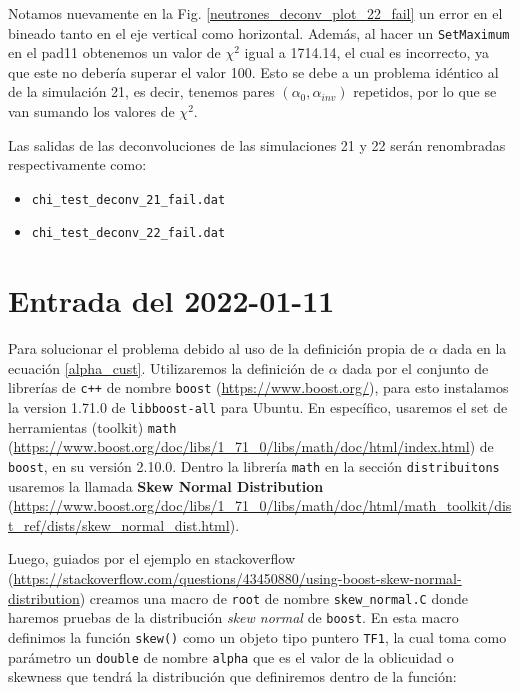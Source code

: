 \documentclass[11pt,letterpaper]{article}
\begin{document}
Notamos nuevamente en la  Fig. \ref{neutrones_deconv_plot_22_fail} un error en el bineado tanto en el eje vertical como horizontal. Además, al hacer un \verb|SetMaximum| en el pad11 obtenemos un valor de $\chi^2$ igual a 1714.14, el cual es incorrecto, ya que este no debería superar el valor 100. Esto se debe a un problema idéntico al de la simulación 21, es decir, tenemos pares $(\alpha_{0},\alpha_{inv})$ repetidos, por lo que se van sumando los valores de $\chi^2$.

Las salidas de las deconvoluciones de las simulaciones 21 y 22 serán renombradas respectivamente como:

\begin{itemize}
\item \verb|chi_test_deconv_21_fail.dat|
\item  \verb|chi_test_deconv_22_fail.dat| 
\end{itemize}

\section{Entrada del 2022-01-11}
\label{2022-01-11}


Para solucionar el problema debido al uso de la definición propia de $\alpha$ dada en la ecuación \eqref{alpha_cust}. Utilizaremos la definición de $\alpha$ dada por el conjunto de librerías de \verb|c++| de nombre \verb|boost| (\url{https://www.boost.org/}), para esto instalamos la version 1.71.0 de \verb|libboost-all| para Ubuntu. En específico, usaremos el set de herramientas (toolkit) \verb|math| (\url{https://www.boost.org/doc/libs/1_71_0/libs/math/doc/html/index.html}) de \verb|boost|, en su versión 2.10.0. Dentro la librería \verb|math| en la sección \verb|distribuitons| usaremos la llamada \textbf{Skew Normal Distribution} (\url{https://www.boost.org/doc/libs/1_71_0/libs/math/doc/html/math_toolkit/dist_ref/dists/skew_normal_dist.html}).

Luego, guiados por el ejemplo en stackoverflow (\url{https://stackoverflow.com/questions/43450880/using-boost-skew-normal-distribution}) creamos una macro de \verb|root| de nombre \verb|skew_normal.C| donde haremos pruebas de la distribución  \textit{skew normal} de \verb|boost|. En esta macro definimos la función \verb|skew()| como un objeto tipo puntero \verb|TF1|, la cual toma como parámetro un \verb|double| de nombre \verb|alpha| que es el valor de la oblicuidad o skewness que tendrá la distribución que definiremos dentro de la función:
\end{document}
